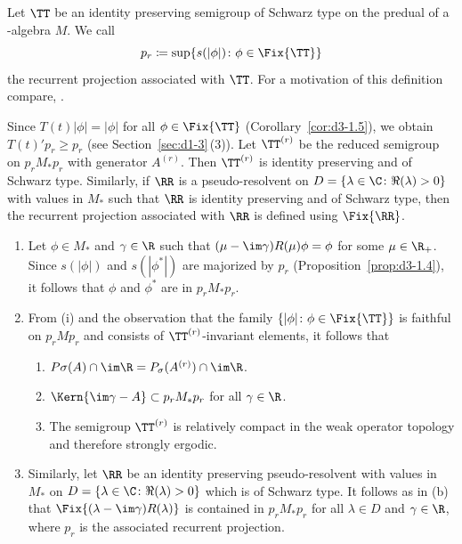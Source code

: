 Let $\TT$ be an identity preserving semigroup of Schwarz type on the predual of a \WA-algebra $M$.
We call
\[
p_{r} \coloneqq \sup\{s(|\phi|) \colon \phi \in \Fix{\TT}\}
\]
the recurrent projection associated with $\TT$.
For a motivation of this definition compare, \eg \textcite[Section 6.3]{davies:1976}.

Since $T(t)|\phi| = |\phi|$ for all $\phi \in \Fix{\TT}$ (Corollary~\ref{cor:d3-1.5}), we obtain $T(t)'p_{r} \geq p_{r}$ (see Section~\ref{sec:d1-3}\,(3)).
Let $\TT^{(r)}$ be the reduced semigroup on $p_{r}M_{*}p_{r}$ with generator $A^{(r)}$.
Then $\TT^{(r)}$ is identity preserving and of Schwarz type.
Similarly, if\/ $\RR$ is a pseudo-resolvent 
on $D = \{\lambda \in \C \colon \Re(\lambda) > 0\}$ with values in $M_{*}$ such that $\RR$ is identity preserving and of Schwarz type, then the recurrent projection associated with $\RR$ is defined using $\Fix{\RR}$.
\begin{remark}\label{rem:d4-3.2}
\begin{enumerate}[\upshape (i), wide, labelindent=.25em]

\item\label{item:d4-3.2-i}
Let $\phi \in M_{*}$ and $\gamma \in \R$ such that $(\mu - \im\gamma)R(\mu)\phi = \phi$ for some $\mu \in \R_{+}$.
Since $s(|\phi|)$ and $s(|\phi^{*}|)$ are majorized by $p_{r}$ (Proposition~\ref{prop:d3-1.4}), it follows that $\phi$ and $\phi^{*}$ are in $p_{r}M_{*}p_{r}$.

\item\label{item:d4-3.2-ii}
From (i) and the observation that the family $\{|\phi| \colon \phi \in \Fix{\TT}\}$ is
faithful on $p_{r}Mp_{r}$ and consists of\/ $\TT^{(r)}$-invariant elements, it follows that
\begin{enumerate}[--]
\item
$P\sigma(A) \cap \im\R = P_{\sigma}(A^{(r)}) \cap \im\R$.

\item
$\Kern{ \im\gamma - A } \subset p_{r}M_{*}p_{r}$ for all $\gamma \in \R$.

\item
The semigroup $\TT^{(r)}$ is relatively compact in the weak operator topology and therefore strongly ergodic.
\end{enumerate}


\item\label{item:d4-3.2-iii}
Similarly, let $\RR$ be an identity preserving pseudo-resolvent with values in $M_{*}$ on $D = \{\lambda \in \C \colon \Re(\lambda) > 0\}$ which is of Schwarz type.
It follows as in (b) that 
$\Fix{(\lambda - \im\gamma)R(\lambda)}$ 
is contained in $p_{r}M_{*}p_{r}$ for all $\lambda \in D$ and $\gamma \in \R$, where $p_{r}$ is the associated recurrent projection.
\end{enumerate}
\end{remark}
